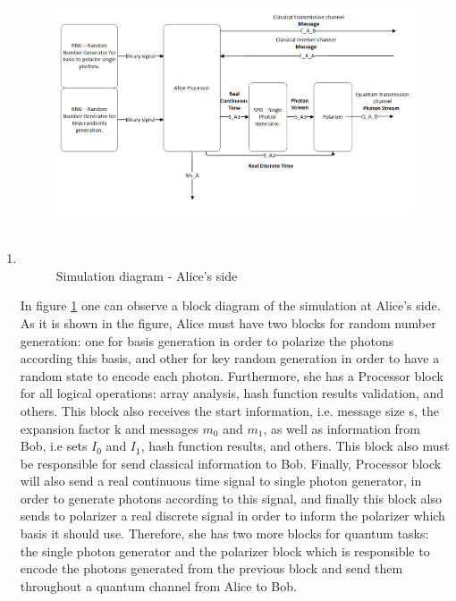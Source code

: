 \begin{enumerate}
  \item

  \begin{figure}[h]
	\centering
	\includegraphics[width=1.1\textwidth, height=9cm]{./sdf/ot_with_discrete_variables/figures/Simulation_Alice.png}
	\caption{Simulation diagram - Alice's side}\label{simulationalice}
\end{figure}

    In figure \ref{simulationalice} one can observe a block diagram of the simulation at Alice's side. As it is shown in the figure, Alice must have two blocks for random number generation: one for basis generation in order to polarize the photons according this basis, and other for key random generation in order to have a random state to encode each photon. Furthermore, she has a Processor block for all logical operations: array analysis, hash function results validation, and others. This block also receives the start information, i.e. message size s, the expansion factor k and messages $m_{0}$ and $m_{1}$, as well as information from Bob, i.e sets $I_{0}$ and $I_{1}$, hash function results, and others. This block also must be responsible for send classical information to Bob. Finally, Processor block will also send a real continuous time signal to single photon generator, in order to generate photons according to this signal, and finally this block also sends to polarizer a real discrete signal in order to inform the polarizer which basis it should use. Therefore, she has two more blocks for quantum tasks: the single photon generator and the polarizer block which is responsible to encode the photons generated from the previous block and send them throughout a quantum channel from Alice to Bob.


\end{enumerate}
